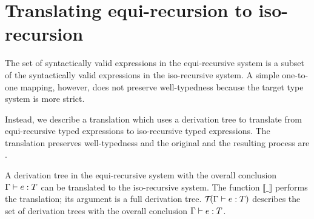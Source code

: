 \section{Translating equi-recursion to iso-recursion}

The set of syntactically valid expressions in the equi-recursive system is a
subset of the syntactically valid expressions in the iso-recursive system. A
simple one-to-one mapping, however, does not preserve well-typedness because
the target type system is more strict.

Instead, we describe a translation which uses a derivation tree to translate
from equi-recursive typed expressions to iso-recursive typed expressions. The
translation preserves well-typedness and the original and the resulting process
are . 

A derivation tree in the equi-recursive system with the overall conclusion
$\typing e T$ can be translated to the iso-recursive system. The function
$\llbracket \_ \rrbracket$ performs the translation; its argument is a full
derivation tree. $\derivTree e T$ describes the set of derivation trees with
the overall conclusion $\typing e T$.



% 
%   
% 
% 
% 
% 
